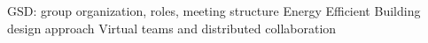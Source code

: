 GSD: group organization, roles, meeting structure
Energy Efficient Building design approach
Virtual teams and distributed collaboration